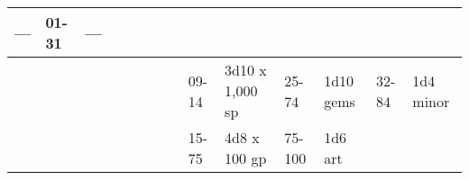 \begin{longtable}{llllllllllllll}
{\begin{minipage}[t]{0.469in}
---\end{minipage}} & \multicolumn{1}{p{0.626in}|}{\begin{minipage}[t]{0.626in}\raggedright
01-31\end{minipage}} & \multicolumn{1}{p{0.469in}|}{\begin{minipage}[t]{0.469in}\centering
---\end{minipage}}\\
\hline
\multicolumn{8}{p{1.150in}|}{\begin{minipage}[t]{1.150in}\centering
\end{minipage}} & \multicolumn{1}{|p{0.393in}|}{\begin{minipage}[t]{0.393in}\raggedright
09-14\end{minipage}} & \multicolumn{1}{p{0.469in}|}{\begin{minipage}[t]{0.469in}\raggedright
3d10 x 1,000 sp\end{minipage}} & \multicolumn{1}{p{0.923in}|}{\begin{minipage}[t]{0.923in}\raggedright
25-74\end{minipage}} & \multicolumn{1}{p{0.469in}|}{\begin{minipage}[t]{0.469in}\raggedright
1d10 gems\end{minipage}} & \multicolumn{1}{p{0.626in}|}{\begin{minipage}[t]{0.626in}\raggedright
32-84\end{minipage}} & \multicolumn{1}{p{0.469in}|}{\begin{minipage}[t]{0.469in}\centering
1d4 minor\end{minipage}}\\
\hline
\multicolumn{8}{p{1.150in}|}{\begin{minipage}[t]{1.150in}\centering
\end{minipage}} & \multicolumn{1}{|p{0.393in}|}{\begin{minipage}[t]{0.393in}\raggedright
15-75\end{minipage}} & \multicolumn{1}{p{0.469in}|}{\begin{minipage}[t]{0.469in}\raggedright
4d8 x 100 gp\end{minipage}} & \multicolumn{1}{p{0.923in}|}{\begin{minipage}[t]{0.923in}\raggedright
75-100\end{minipage}} & \multicolumn{1}{p{0.469in}|}{\begin{minipage}[t]{0.469in}\raggedright
1d6 art\end{minipage}} & \multicolumn{1}{p{0.626in}|}{\begin{minipage}[t]{0.626in}\raggedright

\end{minipage}}
\end{longtable}
